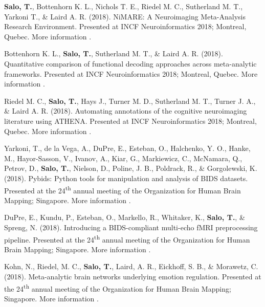 \documentclass[10pt]{article}
\newcommand{\textlink}[3][blue]{\href{#2}{\color{#1}{#3}}}
\begin{document}
\begin{hangparas}{.25in}{1}

	\textbf{Salo, T.}, Bottenhorn K. L., Nichols T. E., Riedel M. C.,
	Sutherland M. T., Yarkoni T., \& Laird A. R. (2018).
	NiMARE: A Neuroimaging Meta-Analysis Research Environment.
	Presented at INCF Neuroinformatics 2018; Montreal, Quebec.
	More information
	\textlink{https://f1000research.com/posters/7-1221}{here}.

	\bigskip

	Bottenhorn K. L., \textbf{Salo, T.}, Sutherland M. T., \& Laird A. R. (2018).
	Quantitative comparison of functional decoding approaches across meta-analytic
	frameworks.
	Presented at INCF Neuroinformatics 2018; Montreal, Quebec.
	More information
	\textlink{https://f1000research.com/posters/7-1222}{here}.

	\bigskip

	Riedel M. C., \textbf{Salo, T.}, Hays J., Turner M. D., Sutherland M. T.,
	Turner J. A., \& Laird A. R. (2018).
	Automating annotations of the cognitive neuroimaging literature using ATHENA.
	Presented at INCF Neuroinformatics 2018; Montreal, Quebec.
	More information
	\textlink{https://f1000research.com/posters/7-1229}{here}.

	\bigskip

	Yarkoni, T., de la Vega, A., DuPre, E., Esteban, O., Halchenko, Y. O.,
	Hanke, M., Hayor-Sasson, V., Ivanov, A., Kiar, G., Markiewicz, C., McNamara, Q.,
	Petrov, D., \textbf{Salo, T.}, Nielson, D., Poline, J. B., Poldrack, R.,
	\& Gorgolewski, K. (2018).
	Pybids: Python tools for manipulation and analysis of BIDS datasets.
	Presented at the 24\textsuperscript{th} annual meeting of the Organization
	for Human Brain Mapping; Singapore.
	More information
	\textlink{https://ww5.aievolution.com/hbm1801/index.cfm?do=abs.viewAbs&abs=3300}{here}.

	\bigskip

	DuPre, E., Kundu, P., Esteban, O., Markello, R., Whitaker, K.,
	\textbf{Salo, T.}, \& Spreng, N. (2018).
	Introducing a BIDS-compliant multi-echo fMRI preprocessing pipeline.
	Presented at the 24\textsuperscript{th} annual meeting of the Organization
	for Human Brain Mapping; Singapore.
	More information
	\textlink{https://ww5.aievolution.com/hbm1801/index.cfm?do=abs.viewAbs&abs=2789}{here}.

	\bigskip

	Kohn, N., Riedel, M. C., \textbf{Salo, T.}, Laird, A. R., Eickhoff, S. B.,
	\& Morawetz, C. (2018).
	Meta-analytic brain networks underlying emotion regulation.
	Presented at the 24\textsuperscript{th} annual meeting of the Organization
	for Human Brain Mapping; Singapore.
	More information
	\textlink{https://ww5.aievolution.com/hbm1801/index.cfm?do=abs.viewAbs&abs=1262}{here}.


\end{hangparas}
\end{document}
